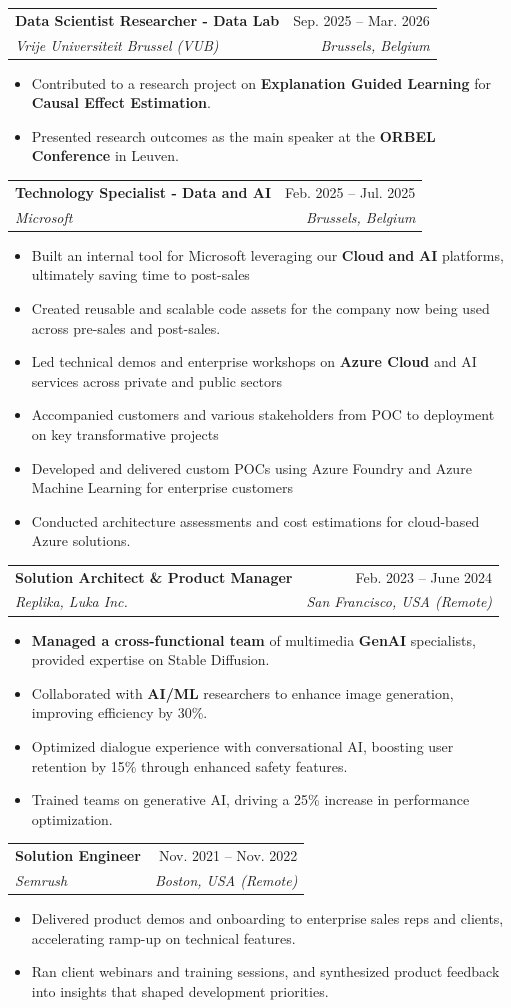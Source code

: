 \documentclass[letterpaper,11pt]{article}
\makeatletter
\newcommand{\resumeItem}[1]{
  \item\small{
    {#1 \vspace{-2pt}}
  }
}
\newcommand{\resumeSubheading}[4]{
  \vspace{-2pt}\item
    \begin{tabular*}{0.97\textwidth}[t]{l@{\extracolsep{\fill}}r}
      \textbf{#1} & #2 \\
      \textit{\small#3} & \textit{\small #4} \\
    \end{tabular*}\vspace{-7pt}
}
\newcommand{\resumeItemListStart}{\begin{itemize}}
\newcommand{\resumeItemListEnd}{\end{itemize}\vspace{-5pt}}
\makeatother
\begin{document}
    \resumeSubheading
      {Data Scientist Researcher - Data Lab}{Sep. 2025 -- Mar. 2026}
      {Vrije Universiteit Brussel (VUB)}{Brussels, Belgium}
      \resumeItemListStart
        \resumeItem{Contributed to a research project on \textbf{Explanation Guided Learning} for \textbf{Causal Effect Estimation}.}
        \resumeItem{Presented research outcomes as the main speaker at the \textbf{ORBEL Conference} in Leuven.}
      \resumeItemListEnd

    \resumeSubheading
      {Technology Specialist - Data and AI}{Feb. 2025 -- Jul. 2025}
      {Microsoft}{Brussels, Belgium}
      \resumeItemListStart
        \resumeItem{Built an internal tool for Microsoft leveraging our \textbf{Cloud} \textbf{and} \textbf{AI} platforms, ultimately saving time to post-sales}
        \resumeItem{Created reusable and scalable code assets for the company now being used across pre-sales and post-sales.}
        \resumeItem{Led technical demos and enterprise workshops on \textbf{Azure Cloud} and AI services across private and public sectors}
        \resumeItem{Accompanied customers and various stakeholders from POC to deployment on key transformative projects}
        \resumeItem{Developed and delivered custom POCs using Azure Foundry and Azure Machine Learning for enterprise customers}
        \resumeItem{Conducted architecture assessments and cost estimations for cloud-based Azure solutions.}
      \resumeItemListEnd

    \resumeSubheading
      {Solution Architect \& Product Manager}{Feb. 2023 -- June 2024}
      {Replika, Luka Inc.}{San Francisco, USA (Remote)}
      \resumeItemListStart
        \resumeItem{\textbf{Managed a cross-functional team} of multimedia \textbf{GenAI} specialists, provided expertise on Stable Diffusion.}
        \resumeItem{Collaborated with \textbf{AI/ML} researchers to enhance image generation, improving efficiency by 30\%.}
        \resumeItem{Optimized dialogue experience with conversational AI, boosting user retention by 15\% through enhanced safety features.}
        \resumeItem{Trained teams on generative AI, driving a 25\% increase in performance optimization.}
      \resumeItemListEnd

    \resumeSubheading
      {Solution Engineer}{Nov. 2021 -- Nov. 2022}
      {Semrush}{Boston, USA (Remote)}
        \resumeItemListStart
        \resumeItem{Delivered product demos and onboarding to enterprise sales reps and clients, accelerating ramp-up on technical features.}
        \resumeItem{Ran client webinars and training sessions, and synthesized product feedback into insights that shaped development priorities.}
      \resumeItemListEnd
\end{document}
